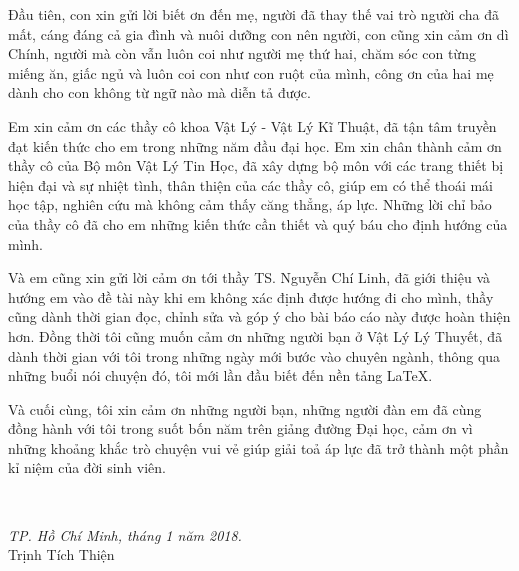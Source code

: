Đầu tiên, con xin gửi lời biết ơn đến mẹ, người đã thay thế vai trò người cha đã mất, cáng đáng cả gia đình và nuôi
dưỡng con nên người, con cũng xin cảm ơn dì Chính, người mà còn vẫn luôn coi như người mẹ thứ hai, chăm sóc con từng
miếng ăn, giấc ngủ và luôn coi con như con ruột của mình, công ơn của hai mẹ dành cho con không từ ngữ nào mà diễn tả được.\par
Em xin cảm ơn các thầy cô khoa Vật Lý - Vật Lý Kĩ Thuật, đã tận tâm truyền đạt kiến thức cho em trong những năm đầu đại học.
Em xin chân thành cảm ơn thầy cô của Bộ môn Vật Lý Tin Học, đã xây dựng bộ môn với các trang thiết bị hiện đại và sự nhiệt
tình, thân thiện của các thầy cô, giúp em có thể thoái mái học tập, nghiên cứu mà không cảm thấy căng thẳng, áp lực. 
Những lời chỉ bảo của thầy cô đã cho em những kiến thức cần thiết và quý báu cho định hướng của mình.\par
Và em cũng xin gửi lời cảm ơn tới thầy TS. Nguyễn Chí Linh, đã giới thiệu và hướng em vào đề tài này khi em không xác định
được hướng đi cho mình, thầy cũng dành thời gian đọc, chỉnh sửa và góp ý cho bài báo cáo này được hoàn thiện hơn. Đồng thời
tôi cũng muốn cảm ơn những người bạn ở Vật Lý Lý Thuyết, đã dành thời gian với tôi trong những ngày mới bước vào chuyên ngành,
thông qua những buổi nói chuyện đó, tôi mới lần đầu biết đến nền tảng LaTeX.\par
Và cuối cùng, tôi xin cảm ơn những người bạn, những người đàn em đã cùng đồng hành với tôi trong suốt bốn năm trên giảng
đường Đại học, cảm ơn vì những khoảng khắc trò chuyện vui vẻ giúp giải toả áp lực đã trở thành một phần kỉ niệm của đời sinh viên.\par~\par
\hfill
\begin{minipage}[H]{0.5\textwidth}
 \centering
 \textsl{TP. Hồ Chí Minh, tháng 1 năm 2018.}\\
 \vspace{1cm}
 Trịnh Tích Thiện 
\end{minipage}

